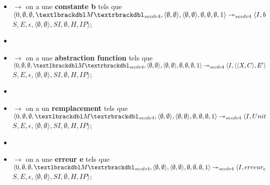 \documentclass[10pt,a4paper]{article}
\begin{document}
			\begin{itemize}
				\item[]$\longrightarrow$ on a une \textbf{constante b} tels que $\langle 0,\emptyset,\emptyset,\textlbrackdbl M\textrbrackdbl_{secdv4},\langle\emptyset,\emptyset\rangle,\langle\emptyset,\emptyset\rangle,\emptyset,\emptyset,\emptyset,1\rangle \\
				\twoheadrightarrow_{secdv4} \langle I,b$ $S,E,\epsilon,\langle\emptyset,\emptyset\rangle,SI,\emptyset,H,IP\rangle$;
				\item[] 
				\item[]$\longrightarrow$ on a une \textbf{abstraction function} tels que
				$\langle 0,\emptyset,\emptyset,\textlbrackdbl M\textrbrackdbl_{secdv4},\langle\emptyset,\emptyset\rangle,\langle\emptyset,\emptyset\rangle,\emptyset,\emptyset,\emptyset,1\rangle \\
				\twoheadrightarrow_{secdv4} \langle I,\langle\langle X,C\rangle,E'\rangle$ $S,E,\epsilon,\langle\emptyset,\emptyset\rangle,SI,\emptyset,H,IP\rangle$;
				\item[] 
				\item[]$\longrightarrow$ on a un \textbf{remplacement} tels que 
				$\langle 0,\emptyset,\emptyset,\textlbrackdbl M\textrbrackdbl_{secdv4},\langle\emptyset,\emptyset\rangle,\langle\emptyset,\emptyset\rangle,\emptyset,\emptyset,\emptyset,1\rangle \\
				\twoheadrightarrow_{secdv4} \langle I,Unit$ $S,E,\epsilon,\langle\emptyset,\emptyset\rangle,SI,\emptyset,H,IP\rangle$;
				\item[] 
				\item[]$\longrightarrow$ on a une \textbf{erreur e} tels que 
				$\langle 0,\emptyset,\emptyset,\textlbrackdbl M\textrbrackdbl_{secdv4},\langle\emptyset,\emptyset\rangle,\langle\emptyset,\emptyset\rangle,\emptyset,\emptyset,\emptyset,1\rangle \\
				\twoheadrightarrow_{secdv4} \langle I,erreur_{e}$ $S,E,\epsilon,\langle\emptyset,\emptyset\rangle,SI,\emptyset,H,IP\rangle$;
			\end{itemize}
		
			\newpage
			
\end{document}
